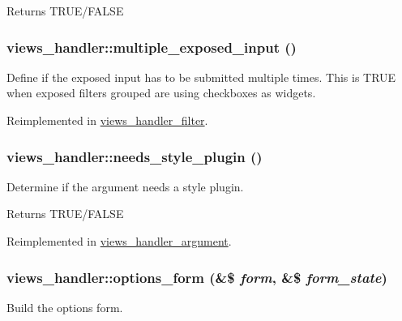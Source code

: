 \begin{DoxyReturn}{Returns}
TRUE/FALSE 
\end{DoxyReturn}
\hypertarget{classviews__handler_a31b0961d9c04ea88289b1a0b34d08ab1}{
\subsubsection[{multiple\_\-exposed\_\-input}]{\setlength{\rightskip}{0pt plus 5cm}views\_\-handler::multiple\_\-exposed\_\-input ()}}
\label{classviews__handler_a31b0961d9c04ea88289b1a0b34d08ab1}
Define if the exposed input has to be submitted multiple times. This is TRUE when exposed filters grouped are using checkboxes as widgets. 

Reimplemented in \hyperlink{classviews__handler__filter_a27b938e318eb0a311480f8d7a684e426}{views\_\-handler\_\-filter}.\hypertarget{classviews__handler_a53baa97a6c218ce4b847c8fb4e65a350}{
\subsubsection[{needs\_\-style\_\-plugin}]{\setlength{\rightskip}{0pt plus 5cm}views\_\-handler::needs\_\-style\_\-plugin ()}}
\label{classviews__handler_a53baa97a6c218ce4b847c8fb4e65a350}
Determine if the argument needs a style plugin.

\begin{DoxyReturn}{Returns}
TRUE/FALSE 
\end{DoxyReturn}


Reimplemented in \hyperlink{classviews__handler__argument_a2c09abe1e98de7438ca0701a14b00861}{views\_\-handler\_\-argument}.\hypertarget{classviews__handler_aa41fcf16b177eb03e35facbae6320f74}{
\subsubsection[{options\_\-form}]{\setlength{\rightskip}{0pt plus 5cm}views\_\-handler::options\_\-form (\&\$ {\em form}, \/  \&\$ {\em form\_\-state})}}
\label{classviews__handler_aa41fcf16b177eb03e35facbae6320f74}
Build the options form. 

